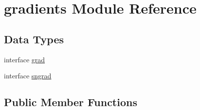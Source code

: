 \hypertarget{classgradients}{\section{gradients Module Reference}
\label{classgradients}
}
\subsection*{Data Types}
\begin{DoxyCompactItemize}
\item 
interface \hyperlink{interfacegradients_1_1grad}{grad}
\item 
interface \hyperlink{interfacegradients_1_1sngrad}{sngrad}
\end{DoxyCompactItemize}
\subsection*{Public Member Functions}
